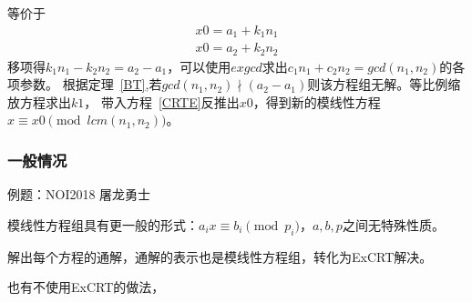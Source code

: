 等价于
\begin{eqnarray}
	x0=a_1+k_1n_1\label{CRTE}\\
	x0=a_2+k_2n_2
\end{eqnarray}
移项得$k_1n_1-k_2n_2=a_2-a_1$，可以使用$exgcd$求出$c_1n_1+c_2n_2=gcd(n_1,n_2)$的各项参数。
根据定理~\ref{BT},若$gcd(n_1,n_2)\nmid(a_2-a_1)$则该方程组无解。等比例缩放方程求出$k1$，
带入方程~\ref{CRTE}反推出$x0$，得到新的模线性方程$x \equiv x0\pmod{lcm(n_1,n_2)}$。
\subsubsection{一般情况}
例题：NOI2018 屠龙勇士

模线性方程组具有更一般的形式：$a_ix\equiv b_i\pmod{p_i}$，$a,b,p$之间无特殊性质。

解出每个方程的通解，通解的表示也是模线性方程组，转化为ExCRT解决。

也有不使用ExCRT的做法，
